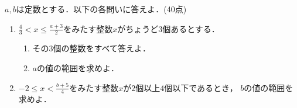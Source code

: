 \(a,b\)は定数とする．以下の各問いに答えよ．(40点)
\begin{enumerate}[itemsep=3ex]
  \item \(\frac{4}{3}<x\le \frac{a+3}{2} \)をみたす整数\(x\)がちょうど\(3\)個あるとする．
  \begin{enumerate}
    \item その\(3\)個の整数をすべて答えよ．
    \item \(a\)の値の範囲を求めよ．
  \end{enumerate}
  \item \(-2\le x<\frac{b+5}{4}\)をみたす整数\(x\)が\(2\)個以上\(4\)個以下であるとき，
        \(b\)の値の範囲を求めよ．
\end{enumerate}
